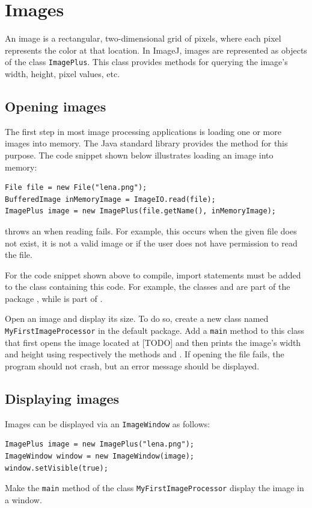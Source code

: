 \documentclass{book}
\begin{document}
\section{Images}
An image is a rectangular, two-dimensional grid of pixels, where each pixel represents the color at that location. In ImageJ, images are represented as objects of the class \texttt{ImagePlus}. This class provides methods for querying the image's width, height, pixel values, etc. 

\subsection{Opening images}
The first step in most image processing applications is loading one or more images into memory. The Java standard library provides the method  for this purpose. The code snippet shown below illustrates loading an image into memory: 
\begin{lstlisting}
File file = new File("lena.png");
BufferedImage inMemoryImage = ImageIO.read(file);
ImagePlus image = new ImagePlus(file.getName(), inMemoryImage);
\end{lstlisting}
 throws an  when reading fails.  For example, this occurs when the given file does not exist, it is not a valid image or if the user does not have permission to read the file.

For the code snippet shown above to compile, import statements must be added to the class containing this code. For example, the classes  and  are part of the package , while  is part of .

\begin{exercise}
Open an image and display its size. To do so, create a new class named \texttt{MyFirstImageProcessor} in the default package. Add a \texttt{main} method to this class that first opens the image located at  [TODO] and then prints the image's width and height using respectively the methods  and . If opening the file fails, the program should not crash, but an error message should be displayed.
\end{exercise}

\subsection{Displaying images}
Images can be displayed via an \texttt{ImageWindow} as follows:
\begin{lstlisting}
ImagePlus image = new ImagePlus("lena.png");
ImageWindow window = new ImageWindow(image);
window.setVisible(true);
\end{lstlisting}
\begin{exercise}
Make the \texttt{main} method of the class \texttt{MyFirstImageProcessor} display the image in a window.
\end{exercise}
\end{document}
